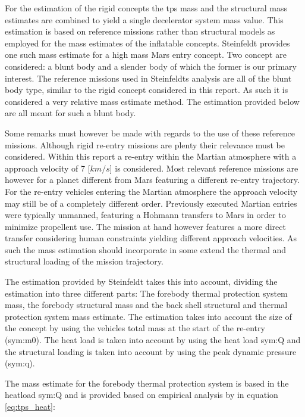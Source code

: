 For the estimation of the rigid concepts the \acrfull{tps} mass and the structural mass estimates are combined to yield a single decelerator system mass value. This estimation is based on reference missions rather than structural models as employed for the mass estimates of the inflatable concepts. Steinfeldt \cite{Steinfeldt2009} provides one such mass estimate for a high mass Mars entry concept. Two concept are considered: a blunt body and a slender body of which the former is our primary interest. The reference missions used in Steinfeldts analysis are all of the blunt body type, similar to the rigid concept considered in this report. As such it is considered a very relative mass estimate method. The estimation provided below are all meant for such a blunt body.

Some remarks must however be made with regards to the use of these reference missions. Although rigid re-entry missions are plenty their relevance must be considered. Within this report a re-entry within the Martian atmosphere with a approach velocity of 7 [$km/s$] is considered. Most relevant reference missions are however for a planet different from Mars featuring a different re-entry trajectory. For the re-entry vehicles entering the Martian atmosphere the approach velocity may still be of a completely different order. Previously executed Martian entries were typically unmanned, featuring a Hohmann transfers to Mars in order to minimize propellent use. The mission at hand however features a more direct transfer considering human constraints yielding different approach velocities. As such the mass estimation should incorporate in some extend the thermal and structural loading of the mission trajectory.

The estimation provided by Steinfeldt takes this into account, dividing the estimation into three different parts: The forebody thermal protection system mass, the forebody structural mass and the back shell structural and thermal protection system mass estimate. The estimation takes into account the size of the concept by using the vehicles total mass at the start of the re-entry (\gls{sym:m0}). The heat load is taken into account by using the heat load \gls{sym:Q} and the structural loading is taken into account by using the peak dynamic pressure (\gls{sym:q}).

The mass estimate for the forebody thermal protection system is based in the heatload \gls{sym:Q} and is provided based on empirical analysis by \cite{Laub2004} in equation \ref{eq:tps_heat}\cite{Steinfeldt2009}:

